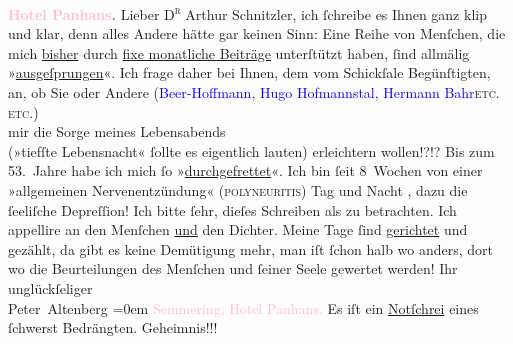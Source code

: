            \raggedleft{}\textcolor{gray}{\textbf{\textcolor{pink}{Hotel Panhans}{}\ledrightnote{\textcolor{pink}{Hotel Panhans}}.}}\pend
           \pstart{}Lieber \textsc{D\textsuperscript{r}} Arthur Schnitzler,\pend\pstart
           ich ſchreibe es Ihnen ganz klip und klar, denn alles Andere hätte gar keinen
               Sinn:\pend
           \pstart
           Eine Reihe von Menſchen, die mich \uline{bisher} durch \uline{fixe monatliche Beiträge} unterſtützt haben, ſind
               allmälig »\uline{ausgeſprungen}«. Ich frage daher bei Ihnen,
               dem vom Schickſale Begünſtigten, an, ob Sie oder Andere (\textcolor{blue}{Beer-Hoffmann}{}\ledrightnote{\textcolor{blue}{Richard Beer-Hofmann}}, \textcolor{blue}{Hugo
                  Hofmannstal}{}\ledrightnote{\textcolor{blue}{Hugo von Hofmannsthal}}, \textcolor{blue}{Hermann Bahr}{}\ledrightnote{\textcolor{blue}{Hermann Bahr}}{ }\textsc{etc. etc.}) {\\}mir die Sorge meines
               Lebensabends{\\}(»tiefſte Lebensnacht« ſollte es eigentlich lauten) erleichtern
               wollen!?!? \introOben{}Bis zum 53. Jahre habe ich mich ſo »\uline{durchgefrettet}«.\introOben{}\pend
           \pstart
           {\pb}Ich bin ſeit 8 Wochen von einer
               »allgemeinen Nervenentzündung« (\textsc{polyneuritis}) Tag und Nacht
                  , dazu die ſeeliſche Depreſſion!\pend
           \pstart
           Ich bitte ſehr, dieſes Schreiben als  zu
               betrachten. \introOben{}Ich appellire an den Menſchen \uline{und} den Dichter.\introOben{}\pend
           \pstart
           Meine Tage ſind \uline{gerichtet} und gezählt, da gibt es
               keine Demütigung mehr, man iſt ſchon halb wo anders, dort wo die Beurteilungen des
               Menſchen und ſeiner Seele  gewertet werden!\pend
           \pstart
           Ihr unglückſeliger{\\[\baselineskip]}\spacefill\mbox{Peter Altenberg}\pend
           \leftskip=0em{}\pstart
           \noindent{}\textcolor{pink}{Semmering, Hotel Panhans.}{}\ledrightnote{\textcolor{pink}{Hotel Panhans}}\pend
           \pstart
           Es iſt ein \uline{Notſchrei} eines ſchwerst
                  Bedrängten.\pend
           \pstart
           \raggedleft{}Geheimnis!!!\pend
           \endnumbering{}  
      